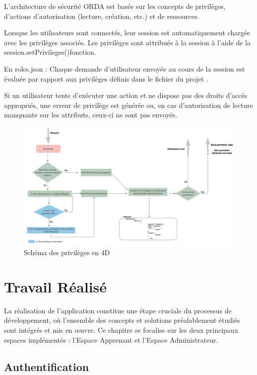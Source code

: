 L'architecture de sécurité ORDA est basée sur les concepts de privilèges, d'actions d'autorisation (lecture, création, etc.) et de ressources.

Lorsque les utilisateurs sont connectés, leur session est automatiquement chargée avec les privilèges associés. Les privilèges sont attribués à la session à l'aide de la session.setPrivileges()fonction.

En roles.json : Chaque demande d'utilisateur envoyée au cours de la session est évaluée par rapport aux privilèges définis dans le fichier du projet .

Si un utilisateur tente d'exécuter une action et ne dispose pas des droits d'accès appropriés, une erreur de privilège est générée ou, en cas d'autorisation de lecture manquante sur les attributs, ceux-ci ne sont pas envoyés.


\begin{figure}[H]
    \centering
    \includegraphics[width=19cm]{Figures/privilege.png}
    \caption{Schéma des privilèges en 4D}
\end{figure}

\section{Travail Réalisé}

La réalisation de l’application constitue une étape cruciale du processus de développement, où l’ensemble des concepts et solutions préalablement étudiés sont intégrés et mis en œuvre. Ce chapitre se focalise sur les deux principaux espaces implémentés : l’Espace Apprenant et l’Espace Administrateur.

\subsection{Authentification}

